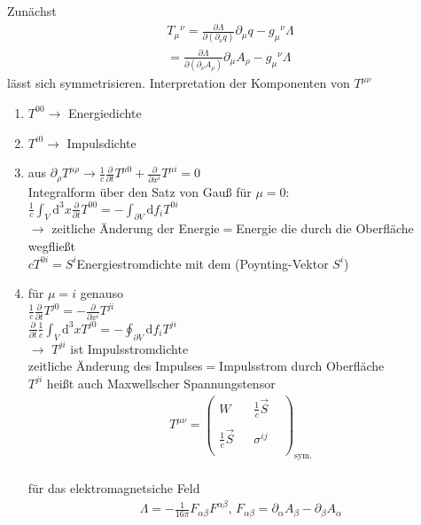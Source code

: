 \documentclass[a4paper]{article}
\begin{document}
Zunächst 
\begin{align}
T_\mu{}^\nu=\frac{\partial \Lambda}{\partial(\partial_\nu q)}\partial_\mu
q-g_\mu{}^\nu\Lambda\\
=\frac{\partial \Lambda}{\partial(\partial_\nu A_\rho)}\partial_\mu
A_\rho-g_\mu{}^\nu\Lambda
\end{align}
lässt sich symmetrisieren.
Interpretation der Komponenten von $T^{\mu\nu}$
\begin{enumerate}
  \item $T^{00} \rightarrow$ Energiedichte
  \item $T^{i0} \rightarrow$ Impulsdichte
  \item aus $\partial_\rho T^{\mu\rho} \rightarrow
  \frac{1}{c}\frac{\partial}{\partial t} T^{\mu 0}+\frac{\partial}{\partial
  x^i} T^{\mu i}=0$ \\ Integralform über den Satz von Gauß für $\mu=0$:\\
  $\frac{1}{c}\int_V \mathrm{d}^3x \frac{\partial}{\partial t} T^{0 0}=-\int_{\partial
  V} \mathrm{d}f_i T^{0i}$ \\ $\rightarrow$ zeitliche Änderung der Energie$=$Energie die
  durch die Oberfläche wegfließt\\ $cT^{0i}=S^i$Energiestromdichte mit dem
  (Poynting-Vektor $S^i$)
  \item für $\mu=i$ genauso \\ $\frac{1}{c}\frac{\partial}{\partial t}
  T^{j0}=-\frac{\partial}{\partial x^i} T^{ji}$\\ $\frac{\partial}{\partial
  t}\frac{1}{c}\int_V\mathrm{d}^3x T^{j0}=-\oint_{\partial V}\mathrm{d}f_i T^{ji}$\\$\rightarrow$
  $T^{ji}$ ist Impulsstromdichte\\zeitliche Änderung des Impulses$=$Impulsstrom
  durch Oberfläche \\ $T^{ji}$ heißt auch Maxwellscher Spannungstensor
  \begin{align}
  T^{\mu\nu}=\begin{pmatrix}W&&\frac{1}{c}\vec{S}&\\&&&\\
  \frac{1}{c}\vec{S}&&\sigma^{ij}&\\&&&\end{pmatrix}_{\text{sym.}}
  \end{align}\\ für das elektromagnetsiche Feld \begin{align}
  \Lambda =-\frac{1}{16\pi}F_{\alpha\beta}F^{\alpha\beta} \text{,   }
  F_{\alpha\beta}=\partial_\alpha A_\beta-\partial_\beta A_\alpha \\

\end{align}
\end{enumerate}
\end{document}
